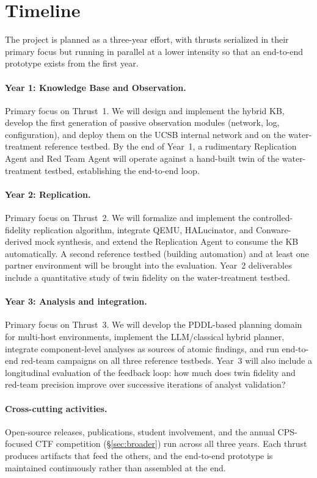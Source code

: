 \section{Timeline}
\label{sec:timeline}

The project is planned as a three-year effort, with thrusts serialized
in their primary focus but running in parallel at a lower intensity so
that an end-to-end prototype exists from the first year.

\paragraph{Year 1: Knowledge Base and Observation.}
Primary focus on Thrust~1. We will design and implement the hybrid
KB, develop the first generation of passive observation modules
(network, log, configuration), and deploy them on the UCSB internal
network and on the water-treatment reference testbed. By the end of
Year~1, a rudimentary Replication Agent and Red Team Agent will
operate against a hand-built twin of the water-treatment testbed,
establishing the end-to-end loop.

\paragraph{Year 2: Replication.}
Primary focus on Thrust~2. We will formalize and implement the
controlled-fidelity replication algorithm, integrate QEMU, HALucinator,
and Conware-derived mock synthesis, and extend the Replication Agent
to consume the KB automatically. A second reference testbed
(building automation) and at least one partner environment will be
brought into the evaluation. Year~2 deliverables include a quantitative
study of twin fidelity on the water-treatment testbed.

\paragraph{Year 3: Analysis and integration.}
Primary focus on Thrust~3. We will develop the PDDL-based planning
domain for multi-host \cps environments, implement the LLM/classical
hybrid planner, integrate component-level analyses as sources of
atomic findings, and run end-to-end red-team campaigns on all three
reference testbeds. Year~3 will also include a longitudinal evaluation
of the feedback loop: how much does twin fidelity and red-team
precision improve over successive iterations of analyst validation?

\paragraph{Cross-cutting activities.}
Open-source releases, publications, student involvement, and the
annual CPS-focused CTF competition (\S\ref{sec:broader}) run across
all three years. Each thrust produces artifacts that feed the others,
and the end-to-end prototype is maintained continuously rather than
assembled at the end.
